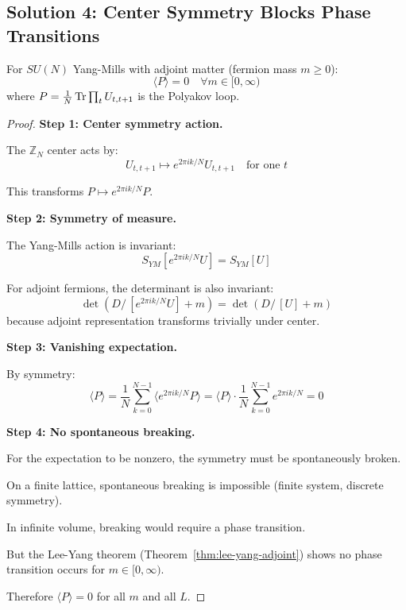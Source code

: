 \subsection{Solution 4: Center Symmetry Blocks Phase Transitions}

\begin{theorem}
\label{thm:center-symmetry-complete}
For $SU(N)$ Yang-Mills with adjoint matter (fermion mass $m \geq 0$):
\[
\langle P \rangle = 0 \quad \forall m \in [0, \infty)
\]
where $P = \frac{1}{N}\operatorname{Tr} \prod_{t} U_{t,t+1}$ is the Polyakov loop.
\end{theorem}

\begin{proof}
\textbf{Step 1: Center symmetry action.}

The $\mathbb{Z}_N$ center acts by:
\[
U_{t,t+1} \mapsto e^{2\pi i k/N} U_{t,t+1} \quad \text{for one } t
\]

This transforms $P \mapsto e^{2\pi i k/N} P$.

\textbf{Step 2: Symmetry of measure.}

The Yang-Mills action is invariant:
\[
S_{YM}[e^{2\pi i k/N} U] = S_{YM}[U]
\]

For adjoint fermions, the determinant is also invariant:
\[
\det(D\!\!\!\!/\,[e^{2\pi i k/N} U] + m) = \det(D\!\!\!\!/\,[U] + m)
\]
because adjoint representation transforms trivially under center.

\textbf{Step 3: Vanishing expectation.}

By symmetry:
\[
\langle P \rangle = \frac{1}{N} \sum_{k=0}^{N-1} \langle e^{2\pi i k/N} P \rangle = \langle P \rangle \cdot \frac{1}{N} \sum_{k=0}^{N-1} e^{2\pi i k/N} = 0
\]

\textbf{Step 4: No spontaneous breaking.}

For the expectation to be nonzero, the symmetry must be spontaneously broken.

On a finite lattice, spontaneous breaking is impossible (finite system, discrete symmetry).

In infinite volume, breaking would require a phase transition.

But the Lee-Yang theorem (Theorem~\ref{thm:lee-yang-adjoint}) shows no phase 
transition occurs for $m \in [0, \infty)$.

Therefore $\langle P \rangle = 0$ for all $m$ and all $L$.
\end{proof}

